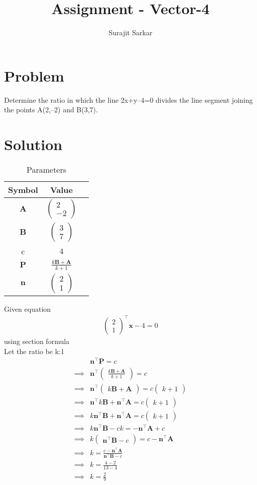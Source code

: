 \documentclass[journal,12pt,twocolumn]{IEEEtran}
\title{\mytitle}
\title{
Assignment - Vector-4
}
\author{Surajit Sarkar}
\newcommand{\myvec}[1]{\ensuremath{\begin{pmatrix}#1\end{pmatrix}}}
\let\vec\mathbf
\begin{document}
\maketitle
\tableofcontents
\bigskip
\section{\textbf{Problem}}
Determine the ratio in which the line 2x+y–4=0 divides the line segment joining the points A(2,–2) and B(3,7).
\section{\textbf{Solution}}
\begin{table}[h]
    \centering
    \begin{tabular}{|c|c|c|}
       \hline
       \textbf{Symbol}&\textbf{Value}  \\
       \hline
	    $\vec{A}$ & $\myvec{
		    2\\
		    -2}$
	    \\
        \hline
	    $\vec{B}$ & $\myvec{3\\7}$
 \\
        \hline
	    c & $4$
 \\
       \hline
            $\vec{P}$ & $\frac{k\vec{B+A}}{k+1}$\\
       \hline
       $\vec{n}$ & $\myvec{2\\1}$\\
       \hline
    \end{tabular}
    \caption{Parameters}
    \label{tab:my_label}
\end{table}
Given equation
\begin{align}
    \myvec{2\\1}^{\top}\vec{x}-4=0
\end{align}
using section formula\\Let the ratio be k:1
\begin{align}
    &\vec{n}^{\top}\vec{P}=c\\
    \implies&\vec{n}^{\top}\myvec{\frac{k\vec{B+A}}{k+1}}=c\\
    \implies&\vec{n}^{\top}\myvec{k\vec{B+A}}=c\myvec{k+1}\\
     \implies&\vec{n}^{\top}k\vec{B}+\vec{n}^{\top}\vec{A}=c\myvec{k+1}\\
     \implies&k\vec{n}^{\top}\vec{B}+\vec{n}^{\top}\vec{A}=c\myvec{k+1}\\
    \implies& k\vec{n}^{\top}\vec{B}-ck=-\vec{n}^{\top}\vec{A}+c\\
     \implies&k\myvec{\vec{n}^{\top}\vec{B}-c}=c-\vec{n}^{\top}\vec{A}\\
    \implies& k=\frac{c-\vec{n}^{\top}\vec{A}}{\vec{n}^{\top}\vec{B}-c}\\
    \implies& k=\frac{4-2}{13-4}\\
   \implies& k=\frac{2}{9}
\end{align}
\end{document}
